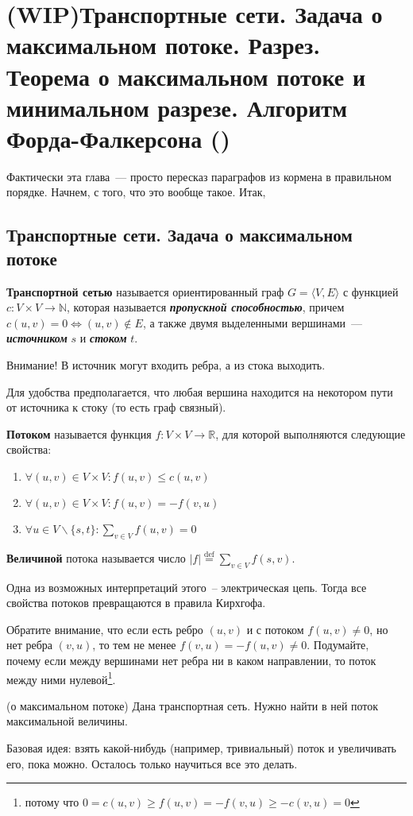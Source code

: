 \let\bf\bfseries
\let\it\itshape
\section{(WIP)Транспортные сети. Задача о максимальном потоке. Разрез. Теорема о максимальном потоке и минимальном разрезе. Алгоритм Форда-Фалкерсона (\groth)}
Фактически эта глава~--- просто пересказ параграфов из кормена в правильном порядке. Начнем, с того, что это вообще такое. Итак,
\subsection{Транспортные сети. Задача о максимальном потоке}
\begin{definition}
	{\bfseries Транспортной сетью} называется ориентированный граф $G=\langle V,E\rangle$ с функцией $c\colon V\times V\to\mathbb{N}$, которая называется {\bf\it пропускной способностью}, причем $c(u,v)=0\iff (u,v)\not\in E$, а также двумя выделенными вершинами~--- {\bf\it источником} $s$ и {\bf\it стоком} $t$.
\end{definition}
Внимание! В источник могут входить ребра, а из стока выходить.

Для удобства предполагается, что любая вершина находится на некотором пути от источника к стоку (то есть граф связный).
\begin{example}
	\needpicture
\end{example}
\begin{definition}
	{\bfseries Потоком} называется функция $f\colon V\times V\to\mathbb{R}$, для которой выполняются следующие свойства:
	\begin{enumerate}
		\item $\forall(u,v)\in V\times V\colon f(u,v)\le c(u,v)$
		\item $\forall(u,v)\in V\times V\colon f(u,v)=-f(v,u)$
		\item $\forall u\in V\smallsetminus\{s,t\}\colon \sum_{v\in V} f(u,v)=0$
	\end{enumerate}
	{\bfseries Величиной} потока называется число $|f|\overset{\mathrm{def}}{=}\sum_{v\in V}f(s,v)$.
\end{definition}
Одна из возможных интерпретаций этого~-- электрическая цепь. Тогда все свойства потоков превращаются в правила Кирхгофа.

Обратите внимание, что если есть ребро $(u,v)$ и с потоком $f(u,v)\ne0$, но нет ребра $(v,u)$, то тем не менее $f(v,u)=-f(u,v)\ne0$. Подумайте, почему если между вершинами нет ребра ни в каком направлении, то поток между ними нулевой\footnote{потому что $0=c(u,v)\ge f(u,v)=-f(v,u)\ge -c(v,u)=0$}.
\begin{problem}(о максимальном потоке)
	Дана транспортная сеть. Нужно найти в ней поток максимальной величины.
\end{problem}
Базовая идея: взять какой-нибудь (например, тривиальный) поток и увеличивать его, пока можно. Осталось только научиться все это делать.

